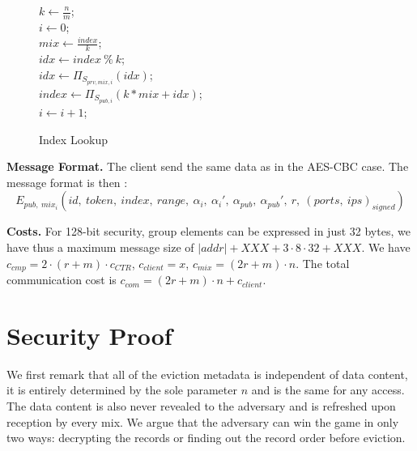\documentclass{llncs}
\begin{document}
\begin{figure}
\centering
\begin{minipage}{0.5\textwidth}
\begin{algorithm}[H]
\DontPrintSemicolon
{}
$k \gets \frac{n}{m}$;\\
$i \gets 0$;\\
{
	$mix \gets \frac{index}{k} $;\\
	$idx \gets index\ \%\ k$;\\
	$idx \gets {\Pi}_{S_{prv, mix, i}}(idx) $;\\
	$index \gets {\Pi}_{S_{pub, i}}(k*mix+idx)$;\\
	$i\gets i+1$;
}
\caption{Index Lookup}
\label{alg:IAS}
\end{algorithm}
\end{minipage}
\end{figure}
\fi

\noindent\textbf{Message Format.}
The client send the same data as in the AES-CBC case. The message format is then : $$E_{pub,\ mix_i}\left (id,\ token,\ index,\ range,\ \alpha_i,\ \alpha_i',\ \alpha_{pub},\ \alpha_{pub}',\ r,\ (ports,\ ips)_{signed}\right )$$

\noindent\textbf{Costs.} For 128-bit security, group elements can be expressed in just 32 bytes, we have thus a maximum message size of $|addr|+XXX + 3 \cdot 8 \cdot 32 + XXX$. We have $c_{cmp} = 2\cdot (r+m) \cdot c_{CTR} $, $c_{client}=x$, $c_{mix}= (2r+m)\cdot n$. The total communication cost is $c_{com}= (2r+m)\cdot n + c_{client}$.

\section{Security Proof}\label{Security}

We first remark that all of the eviction metadata is independent of data content, it is entirely determined by the sole parameter $n$ and is the same for any access. The data content is also never revealed to the adversary and is refreshed upon reception by every mix.
We argue that the adversary can win the game in only two ways: decrypting the records or finding out the record order before eviction. 
\end{document}

